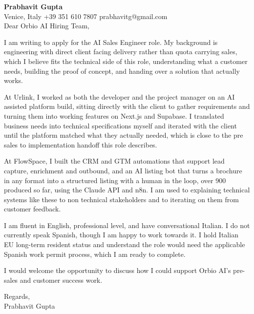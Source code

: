 \documentclass[a4paper,10.5pt]{article}
\begin{document}
\textbf{Prabhavit Gupta}\\
Venice, Italy \textbar{} +39 351 610 7807 \textbar{} prabhavitg@gmail.com\\[10pt]
Dear Orbio AI Hiring Team,

I am writing to apply for the AI Sales Engineer role. My background is engineering with direct client facing delivery rather than quota carrying sales, which I believe fits the technical side of this role, understanding what a customer needs, building the proof of concept, and handing over a solution that actually works.

At Urlink, I worked as both the developer and the project manager on an AI assisted platform build, sitting directly with the client to gather requirements and turning them into working features on Next.js and Supabase. I translated business needs into technical specifications myself and iterated with the client until the platform matched what they actually needed, which is close to the pre sales to implementation handoff this role describes.

At FlowSpace, I built the CRM and GTM automations that support lead capture, enrichment and outbound, and an AI listing bot that turns a brochure in any format into a structured listing with a human in the loop, over 900 produced so far, using the Claude API and n8n. I am used to explaining technical systems like these to non technical stakeholders and to iterating on them from customer feedback.

I am fluent in English, professional level, and have conversational Italian. I do not currently speak Spanish, though I am happy to work towards it. I hold Italian EU long-term resident status and understand the role would need the applicable Spanish work permit process, which I am ready to complete.

I would welcome the opportunity to discuss how I could support Orbio AI's pre-sales and customer success work.

Regards,\\
Prabhavit Gupta
\end{document}
